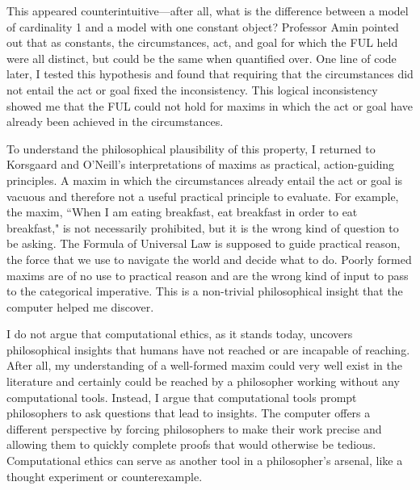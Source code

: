 \begin{isabellebody}
\begin{isamarkuptext}
This appeared counterintuitive—after all, what is the difference between a model of cardinality 
1 and a model with one constant object? Professor Amin pointed out that as constants, the circumstances, 
act, and goal for which the FUL held were all distinct, but could be the same when quantified over. One line 
of code later, I tested this hypothesis and found that requiring that the circumstances did 
not entail the act or goal fixed the inconsistency. This logical inconsistency showed me that the FUL 
could not hold for maxims in which the act or goal have already been achieved in the circumstances.

To understand the philosophical plausibility of this property, I returned to Korsgaard and O'Neill's 
interpretations of maxims as practical, action-guiding principles. A maxim in 
which the circumstances already entail the act or goal is vacuous and therefore not a useful practical principle 
to evaluate. For example, the maxim, ``When I am eating breakfast, eat breakfast in order to eat breakfast," 
is not necessarily prohibited, but it is the wrong kind of question to be asking. The Formula of Universal 
Law is supposed to guide practical reason, the force that we use to navigate the world and decide what 
to do. Poorly formed maxims are of no use to practical reason and are the wrong kind of input to pass
to the categorical imperative. This is a non-trivial philosophical insight that the computer helped me discover.%
\end{isamarkuptext}\isamarkuptrue%
%
\isadelimdocument
%
\endisadelimdocument
%
\isatagdocument
%
\isamarkuptrue%
%
\endisatagdocument
{\isafolddocument}%
%
\isadelimdocument
%
\endisadelimdocument
%
\begin{isamarkuptext}%
I do not argue that computational ethics, as it stands today, uncovers philosophical insights that humans have not reached 
or are incapable of reaching. After all, my understanding of a well-formed maxim could 
very well exist in the literature and certainly could be reached by a philosopher working without any 
computational tools. Instead, I argue that computational tools prompt philosophers to ask questions that 
lead to insights. The computer offers a different perspective by forcing philosophers to make their 
work precise and allowing them to quickly complete proofs that would otherwise be tedious. Computational 
ethics can serve as another tool in a philosopher's arsenal, like a thought experiment or counterexample.


\end{isamarkuptext}
\end{isabellebody}
